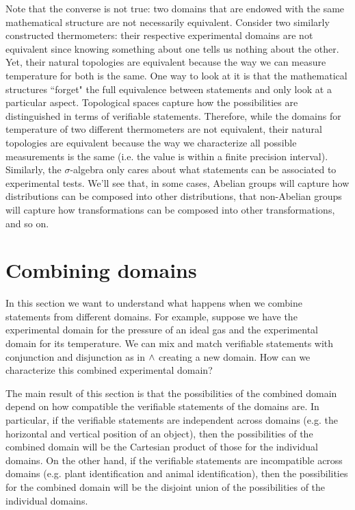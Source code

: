 \documentclass[11pt,letterpaper,fleqn]{memoir} %
\begin{document}
Note that the converse is not true: two domains that are endowed with the same mathematical structure are not necessarily equivalent. Consider two similarly constructed thermometers: their respective experimental domains are not equivalent since knowing something about one tells us nothing about the other. Yet, their natural topologies are equivalent because the way we can measure temperature for both is the same. One way to look at it is that the mathematical structures ``forget" the full equivalence between statements and only look at a particular aspect. Topological spaces capture how the possibilities are distinguished in terms of verifiable statements. Therefore, while the domains for temperature of two different thermometers are not equivalent, their natural topologies are equivalent because the way we characterize all possible measurements is the same (i.e. the value is within a finite precision interval). Similarly, the $\sigma$-algebra only cares about what statements can be associated to experimental tests. We'll see that, in some cases, Abelian groups will capture how distributions can be composed into other distributions, that non-Abelian groups will capture how transformations can be composed into other transformations, and so on.

\section{Combining domains}

In this section we want to understand what happens when we combine statements from different domains. For example, suppose we have the experimental domain for the pressure of an ideal gas and the experimental domain for its temperature. We can mix and match verifiable statements with conjunction and disjunction as in $\wedge$ creating a new domain. How can we characterize this combined experimental domain?

The main result of this section is that the possibilities of the combined domain depend on how compatible the verifiable statements of the domains are. In particular, if the verifiable statements are independent across domains (e.g. the horizontal and vertical position of an object), then the possibilities of the combined domain will be the Cartesian product of those for the individual domains. On the other hand, if the verifiable statements are incompatible across domains (e.g. plant identification and animal identification), then the possibilities for the combined domain will be the disjoint union of the possibilities of the individual domains.
\end{document}
